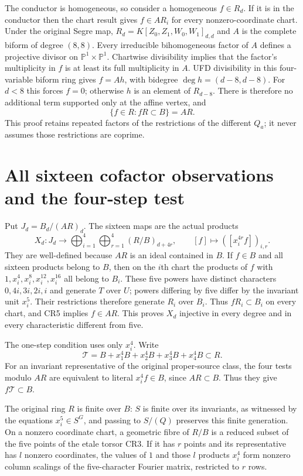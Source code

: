 \documentclass[11pt]{article}
\begin{document}
The conductor is homogeneous, so consider a homogeneous $f\in R_d$.
If it is in the conductor then the chart result gives $f\in AR_i$
for every nonzero-coordinate chart.  Under the original Segre map,
$R_d=K[Z_0,Z_1,W_0,W_1]_{d,d}$ and $A$ is the complete biform of
degree $(8,8)$.  Every irreducible bihomogeneous factor of $A$
defines a projective divisor on $\mathbb P^1\times\mathbb P^1$.
Chartwise divisibility implies that the factor's multiplicity in
$f$ is at least its full multiplicity in $A$.  UFD divisibility
in this four-variable biform ring gives $f=Ah$, with bidegree
$\deg h=(d-8,d-8)$.  For $d<8$ this forces $f=0$; otherwise $h$
is an element of $R_{d-8}$.  There is therefore no additional
term supported only at the affine vertex, and
\[
 \boxed{\{f\in R:fR\subset B\}=AR.}                            \tag{CR5}
\]
This proof retains repeated factors of the restrictions of the
different $Q_a$; it never assumes those restrictions are coprime.

\section{All sixteen cofactor observations and the four-step test}
Put $J_d=B_d/(AR)_d$.  The sixteen maps are the actual products
\[
 X_d:J_d\longrightarrow\bigoplus_{i=1}^4\bigoplus_{r=1}^4
                          (R/B)_{d+4r},
 \qquad [f]\longmapsto([x_i^{4r}f])_{i,r}.                       \tag{CR6}
\]
They are well-defined because $AR$ is an ideal contained in $B$.
If $f\in B$ and all sixteen products belong to $B$, then on the
$i$th chart the products of $f$ with
$1,x_i^4,x_i^8,x_i^{12},x_i^{16}$ all belong to $B_i$.
These five powers have distinct characters $0,4i,3i,2i,i$ and
generate $T$ over $U$; powers differing by five differ by the
invariant unit $x_i^5$.  Their restrictions therefore generate
$R_i$ over $B_i$.  Thus $fR_i\subset B_i$ on every chart, and
CR5 implies $f\in AR$.  This proves $X_d$ injective in every
degree and in every characteristic different from five.

The one-step condition uses only $x_i^4$.  Write
\[
 \mathcal T=B+x_1^4B+x_2^4B+x_3^4B+x_4^4B\subset R.            \tag{CR7}
\]
For an invariant representative of the original proper-source
class, the four tests modulo $AR$ are equivalent to literal
$x_i^4f\in B$, since $AR\subset B$.  Thus they give
$f\mathcal T\subset B$.

The original ring $R$ is finite over $B$: $S$ is finite over its
invariants, as witnessed by the equations $x_i^5\in S^G$, and
passing to $S/(Q)$ preserves this finite generation.  On a nonzero
coordinate chart, a geometric fibre of $R/B$ is a reduced subset
of the five points of the etale torsor CR3.  If it has $r$ points
and its representative has $l$ nonzero coordinates, the values of
$1$ and those $l$ products $x_i^4$ form nonzero column scalings
of the five-character Fourier matrix, restricted to $r$ rows.
\end{document}
